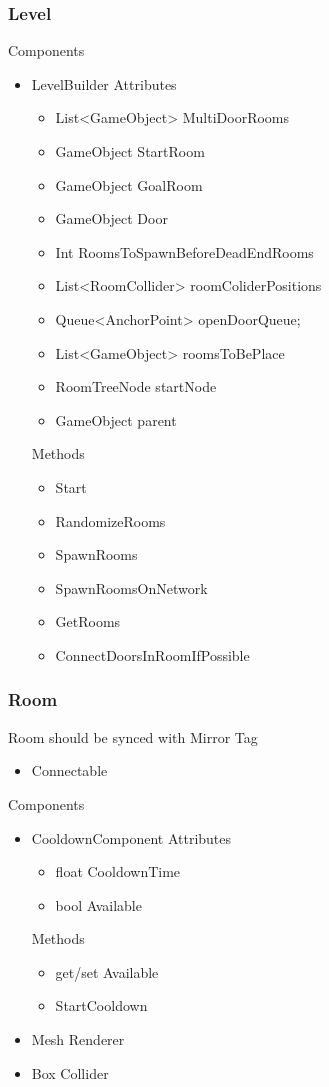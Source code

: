 \documentclass[11pt]{article}
\begin{document}
\subsubsection{Level}
Components
\begin{itemize}
	\item LevelBuilder
	\newline Attributes
	\begin{itemize}
		\item List<GameObject> MultiDoorRooms
		\item GameObject StartRoom
		\item GameObject GoalRoom
		\item GameObject Door
		\item Int RoomsToSpawnBeforeDeadEndRooms
		\item List<RoomCollider> roomColiderPositions
		\item Queue<AnchorPoint> openDoorQueue;
		\item List<GameObject> roomsToBePlace
		\item RoomTreeNode startNode
		\item GameObject parent
	\end{itemize}
	Methods
	\begin{itemize}
		\item Start
		\item RandomizeRooms
		\item SpawnRooms
		\item SpawnRoomsOnNetwork
		\item GetRooms
		\item ConnectDoorsInRoomIfPossible
	\end{itemize}
\end{itemize}

\subsubsection{Room}
Room should be synced with Mirror
\newline Tag
\begin{itemize}
	\item Connectable
\end{itemize}
Components
\begin{itemize}
	\item CooldownComponent
	\newline Attributes
	\begin{itemize}
		\item float CooldownTime
		\item bool Available
	\end{itemize}
	Methods
	\begin{itemize}
		\item get/set Available
		\item StartCooldown
	\end{itemize}
	\item Mesh Renderer
	\item Box Collider
\end{itemize}
\end{document}
